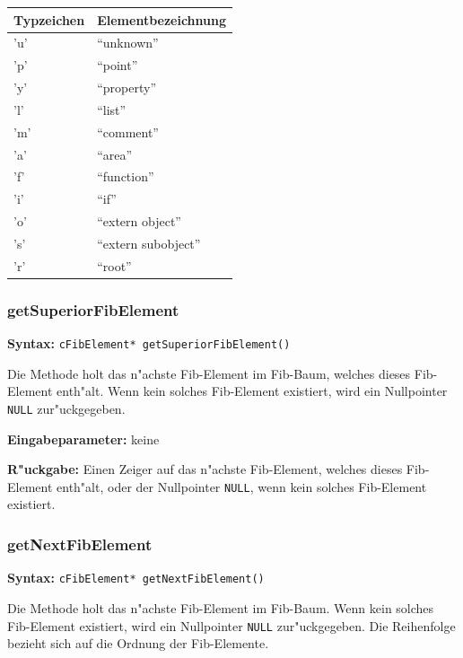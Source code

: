 \begin{center}
\begin{tabular}{|p{20mm}|p{30mm}|}\hline
	Typ\-zeichen & Elementbezeichnung \\\hline\hline
	'u' & ``unknown''\\\hline
	'p' & ``point''\\\hline
	'y' & ``property''\\\hline
	'l' & ``list''\\\hline
	'm' & ``comment''\\\hline
	'a' & ``area''\\\hline
	'f' & ``function''\\\hline
	'i' & ``if''\\\hline
	'o' & ``extern object''\\\hline
	's' & ``extern subobject''\\\hline
	'r' & ``root''\\\hline
\end{tabular}
\end{center}

\subsubsection{getSuperiorFibElement}

\textbf{Syntax:} \verb|cFibElement* getSuperiorFibElement()|

\bigskip\noindent
Die Methode holt das n"achste Fib-Element im Fib-Baum, welches dieses Fib-Element enth"alt. Wenn kein solches Fib-Element existiert, wird ein Nullpointer \verb|NULL| zur"uckgegeben.

\bigskip\noindent
\textbf{Eingabeparameter:} keine

\bigskip\noindent
\textbf{R"uckgabe:} Einen Zeiger auf das n"achste Fib-Element, welches dieses Fib-Element enth"alt, oder der Nullpointer \verb|NULL|, wenn kein solches Fib-Element existiert.


\subsubsection{getNextFibElement}
\textbf{Syntax:} \verb|cFibElement* getNextFibElement()|

\bigskip\noindent
Die Methode holt das n"achste Fib-Element im Fib-Baum. Wenn kein solches Fib-Element existiert, wird ein Nullpointer \verb|NULL| zur"uckgegeben. Die Reihenfolge bezieht sich auf die Ordnung der Fib-Elemente.

